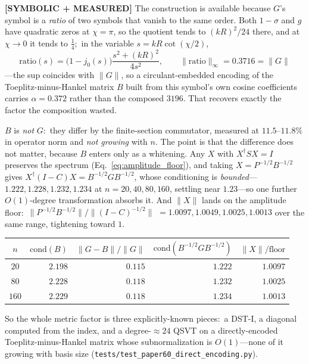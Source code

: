 \documentclass[aps,pra,twocolumn,superscriptaddress,longbibliography]{revtex4-2}
\begin{document}
\textbf{[SYMBOLIC + MEASURED]} The construction is available because
$G$'s symbol is a \emph{ratio} of two symbols that vanish to the same order.
Both $1-\sigma$ and $g$ have quadratic zeros at $\chi=\pi$, so the quotient
tends to $(kR)^2/24$ there, and at $\chi\to0$ it tends to $\tfrac14$;\ in the
variable $s=kR\cot(\chi/2)$,
\begin{equation}
\mathrm{ratio}(s)=\bigl(1-j_0(s)\bigr)\frac{s^{2}+(kR)^{2}}{4s^{2}},
\qquad \|\mathrm{ratio}\|_\infty=0.3716=\|G\|
\label{eq:ratio_symbol}
\end{equation}
---the sup coincides with $\|G\|$, so a circulant-embedded encoding of the
Toeplitz-minus-Hankel matrix $B$ built from this symbol's own cosine
coefficients carries $\alpha=0.372$ rather than the composed $3196$.  That
recovers exactly the factor the composition wasted.

$B$ is \emph{not} $G$:\ they differ by the finite-section commutator, measured
at $11.5$--$11.8\%$ in operator norm and \emph{not growing} with $n$.  The
point is that the difference does not matter, because $B$ enters only as a
whitening.  Any $X$ with $X^\dagger SX=I$ preserves the spectrum
(Eq.~\eqref{eq:amplitude_floor}), and taking $X=P^{-1/2}B^{-1/2}$ gives
$X^\dagger(I-C)X=B^{-1/2}GB^{-1/2}$, whose conditioning is
\emph{bounded}---$1.222,1.228,1.232,1.234$ at $n=20,40,80,160$, settling near
$1.23$---so one further $O(1)$-degree transformation absorbs it.  And
$\|X\|$ lands on the amplitude floor:\ $\|P^{-1/2}B^{-1/2}\|/\|(I-C)^{-1/2}\|$
$=1.0097,1.0049,1.0025,1.0013$ over the same range, tightening toward $1$.
\begin{center}
\begin{tabular}{crrrr}
\toprule
$n$ & $\mathrm{cond}(B)$ & $\|G-B\|/\|G\|$ & $\mathrm{cond}(B^{-1/2}GB^{-1/2})$ & $\|X\|/\text{floor}$\\
\midrule
$20$  & $2.198$ & $0.115$ & $1.222$ & $1.0097$\\
$80$  & $2.228$ & $0.118$ & $1.232$ & $1.0025$\\
$160$ & $2.229$ & $0.118$ & $\mathbf{1.234}$ & $\mathbf{1.0013}$\\
\bottomrule
\end{tabular}
\end{center}
So the whole metric factor is three explicitly-known pieces:\ a DST-I, a
diagonal computed from the index, and a degree-$\approx\!24$ QSVT on a
directly-encoded Toeplitz-minus-Hankel matrix whose subnormalization is
$O(1)$---none of it growing with basis size
(\texttt{tests/test\_paper60\_direct\_encoding.py}).
\end{document}
